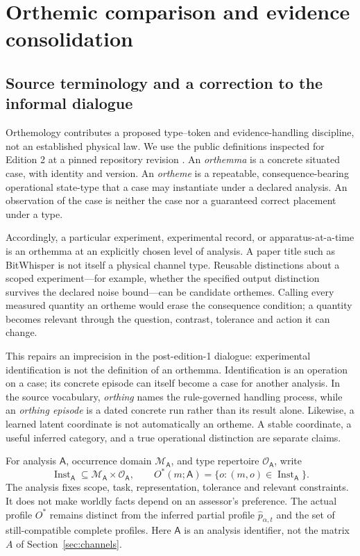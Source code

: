 \section{Orthemic comparison and evidence consolidation}\label{sec:orthemic}
\subsection{Source terminology and a correction to the informal dialogue}
Orthemology contributes a proposed type--token and evidence-handling discipline, not an established physical law. We use the public definitions inspected for Edition 2 at a pinned repository revision \citep{orthemology}. An \emph{orthemma} is a concrete situated case, with identity and version. An \emph{ortheme} is a repeatable, consequence-bearing operational state-type that a case may instantiate under a declared analysis. An observation of the case is neither the case nor a guaranteed correct placement under a type.

Accordingly, a particular experiment, experimental record, or apparatus-at-a-time is an orthemma at an explicitly chosen level of analysis. A paper title such as BitWhisper is not itself a physical channel type. Reusable distinctions about a scoped experiment---for example, whether the specified output distinction survives the declared noise bound---can be candidate orthemes. Calling every measured quantity an ortheme would erase the consequence condition; a quantity becomes relevant through the question, contrast, tolerance and action it can change.

This repairs an imprecision in the post-edition-1 dialogue: experimental identification is not the definition of an orthemma. Identification is an operation on a case; its concrete episode can itself become a case for another analysis. In the source vocabulary, \emph{orthing} names the rule-governed handling process, while an \emph{orthing episode} is a dated concrete run rather than its result alone. Likewise, a learned latent coordinate is not automatically an ortheme. A stable coordinate, a useful inferred category, and a true operational distinction are separate claims.

For analysis $\mathsf A$, occurrence domain $\mathcal M_{\mathsf A}$, and type repertoire $\mathcal O_{\mathsf A}$, write
\begin{equation}\label{eq:orthemicprofile}
 \operatorname{Inst}_{\mathsf A}\subseteq
 \mathcal M_{\mathsf A}\times\mathcal O_{\mathsf A},\qquad
 O^*(m;\mathsf A)=\{o:(m,o)\in\operatorname{Inst}_{\mathsf A}\}.
\end{equation}
The analysis fixes scope, task, representation, tolerance and relevant constraints. It does not make worldly facts depend on an assessor's preference. The actual profile $O^*$ remains distinct from the inferred partial profile $\hat p_{\alpha,t}$ and the set of still-compatible complete profiles. Here $\mathsf A$ is an analysis identifier, not the matrix $A$ of Section~\ref{sec:channels}.

